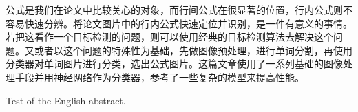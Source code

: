 
\begin{cabstract}
	公式是我们在论文中比较关心的对象，而行间公式在很显著的位置，行内公式则不容易快速分辨。将论文图片中的行内公式快速定位并识别，是一件有意义的事情。若把这看作一个目标检测的问题，则可以使用经典的目标检测算法去解决这个问题。又或者以这个问题的特殊性为基础，先做图像预处理，进行单词分割，再使用分类器对单词图片进行分类，选出公式图片。这篇文章使用了一系列基础的图像处理手段并用神经网络作为分类器，参考了一些复杂的模型来提高性能。
\end{cabstract}

\begin{eabstract}
	Test of the English abstract.
\end{eabstract}


